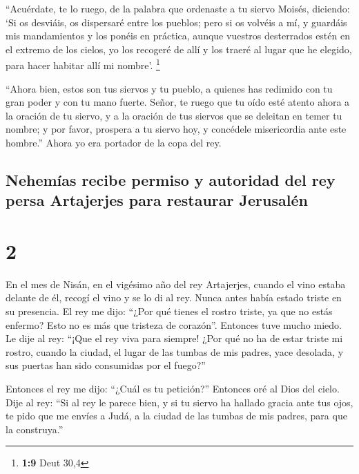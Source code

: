  ``Acuérdate, te lo ruego, de la palabra que ordenaste a
tu siervo Moisés, diciendo: `Si os desviáis, os dispersaré entre los
pueblos;  pero si os volvéis a mí, y guardáis mis
mandamientos y los ponéis en práctica, aunque vuestros desterrados estén
en el extremo de los cielos, yo los recogeré de allí y los traeré al
lugar que he elegido, para hacer habitar allí mi nombre'. \footnote{\textbf{1:9}
  Deut 30,4}

 ``Ahora bien, estos son tus siervos y tu pueblo, a
quienes has redimido con tu gran poder y con tu mano fuerte.
 Señor, te ruego que tu oído esté atento ahora a la
oración de tu siervo, y a la oración de tus siervos que se deleitan en
temer tu nombre; y por favor, prospera a tu siervo hoy, y concédele
misericordia ante este hombre.'' Ahora yo era portador de la copa del
rey.

\hypertarget{nehemuxedas-recibe-permiso-y-autoridad-del-rey-persa-artajerjes-para-restaurar-jerusaluxe9n}{%
\subsection{Nehemías recibe permiso y autoridad del rey persa Artajerjes
para restaurar
Jerusalén}\label{nehemuxedas-recibe-permiso-y-autoridad-del-rey-persa-artajerjes-para-restaurar-jerusaluxe9n}}

\hypertarget{section-1}{%
\section{2}\label{section-1}}

 En el mes de Nisán, en el vigésimo año del rey
Artajerjes, cuando el vino estaba delante de él, recogí el vino y se lo
di al rey. Nunca antes había estado triste en su presencia.
 El rey me dijo: ``¿Por qué tienes el rostro triste, ya
que no estás enfermo? Esto no es más que tristeza de corazón''. Entonces
tuve mucho miedo.  Le dije al rey: ``¡Que el rey viva para
siempre! ¿Por qué no ha de estar triste mi rostro, cuando la ciudad, el
lugar de las tumbas de mis padres, yace desolada, y sus puertas han sido
consumidas por el fuego?''

 Entonces el rey me dijo: ``¿Cuál es tu petición?''
Entonces oré al Dios del cielo.  Dije al rey: ``Si al rey
le parece bien, y si tu siervo ha hallado gracia ante tus ojos, te pido
que me envíes a Judá, a la ciudad de las tumbas de mis padres, para que
la construya.''

